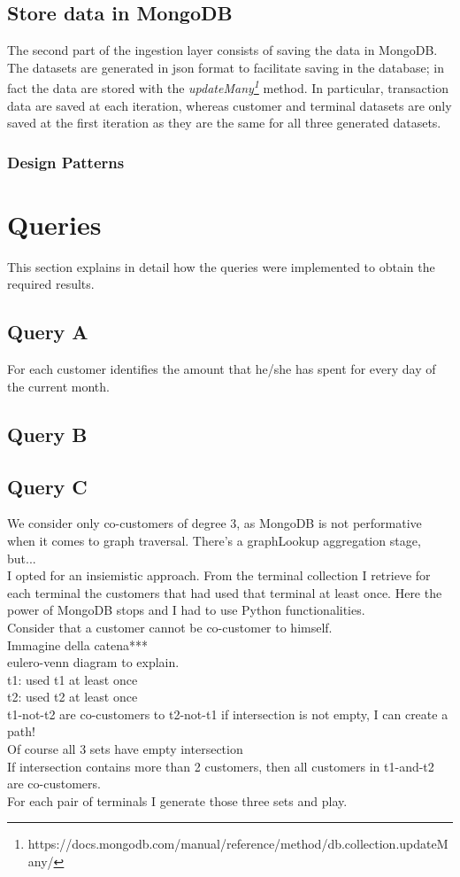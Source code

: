 \documentclass[runningheads]{llncs}
\begin{document}
\subsection{Store data in MongoDB}

The second part of the ingestion layer consists of saving the data in MongoDB. The datasets are generated in json format to facilitate saving in the database; in fact the data are stored with the \emph{updateMany\footnote{https://docs.mongodb.com/manual/reference/method/db.collection.updateMany/}} method. In particular, transaction data are saved at each iteration, whereas customer and terminal datasets are only saved at the first iteration as they are the same for all three generated datasets.

\subsubsection{Design Patterns}

\section{Queries}

This section explains in detail how the queries were implemented to obtain the required results.

\subsection{Query A}

For each customer identifies the amount that he/she has spent for every day of the current month.

\subsection{Query B}
\subsection{Query C}
We consider only co-customers of degree 3, as MongoDB is not performative when it comes to graph traversal. There's a graphLookup aggregation stage, but...\\
I opted for an insiemistic approach. From the terminal collection I retrieve for each terminal the customers that had used that terminal at least once. Here the power of MongoDB stops and I had to use Python functionalities.\\
Consider that a customer cannot be co-customer to himself.\\
Immagine della catena***\\
eulero-venn diagram to explain.\\
t1: used t1 at least once\\
t2: used t2 at least once\\
t1-not-t2 are co-customers to t2-not-t1 if intersection is not empty,
I can create a path!\\
Of course all 3 sets have empty intersection\\
If intersection contains more than 2 customers, then all customers in t1-and-t2 are co-customers.\\
For each pair of terminals I generate those three sets and play.
\end{document}
